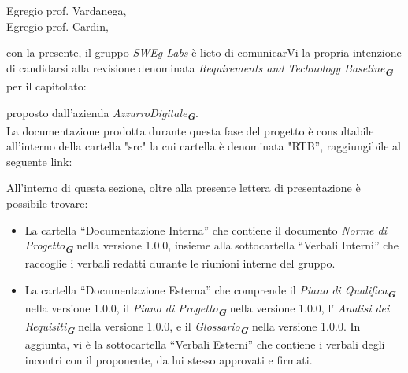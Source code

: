 
\fancyfoot[C]{\thepage}                %



Egregio prof. Vardanega, \\
Egregio prof. Cardin, \\
\vspace{0.5cm}

con la presente, il gruppo \emph{SWEg Labs} è lieto di comunicarVi la propria intenzione di candidarsi alla revisione denominata \emph{Requirements and Technology Baseline}\textsubscript{\textit{\textbf{G}}} per il capitolato:\\
\begin{center}
\end{center}
proposto dall’azienda \emph{AzzurroDigitale}\textsubscript{\textit{\textbf{G}}}.\\
La documentazione prodotta durante questa fase del progetto è consultabile all’interno della cartella "src"
la cui cartella è denominata "RTB”, raggiungibile al seguente link: 
\begin{center}
\end{center}
All’interno di questa sezione, oltre alla presente lettera di presentazione è possibile trovare:
\begin{itemize}
\item La cartella “Documentazione Interna” che contiene il documento \emph{Norme di Progetto}\textsubscript{\textit{\textbf{G}}} nella versione 1.0.0, insieme alla sottocartella “Verbali Interni” che raccoglie i verbali redatti durante le riunioni interne del gruppo.
\item La cartella “Documentazione Esterna” che comprende il \emph{Piano di Qualifica}\textsubscript{\textit{\textbf{G}}} nella versione 1.0.0, il \emph{Piano di Progetto}\textsubscript{\textit{\textbf{G}}} nella versione 1.0.0, l' \emph{Analisi dei Requisiti}\textsubscript{\textit{\textbf{G}}} nella versione 1.0.0, e il \emph{Glossario}\textsubscript{\textit{\textbf{G}}} nella versione 1.0.0. In aggiunta, vi è la sottocartella “Verbali Esterni” che contiene i verbali degli incontri con il proponente, da lui stesso approvati e firmati.
\end{itemize}
